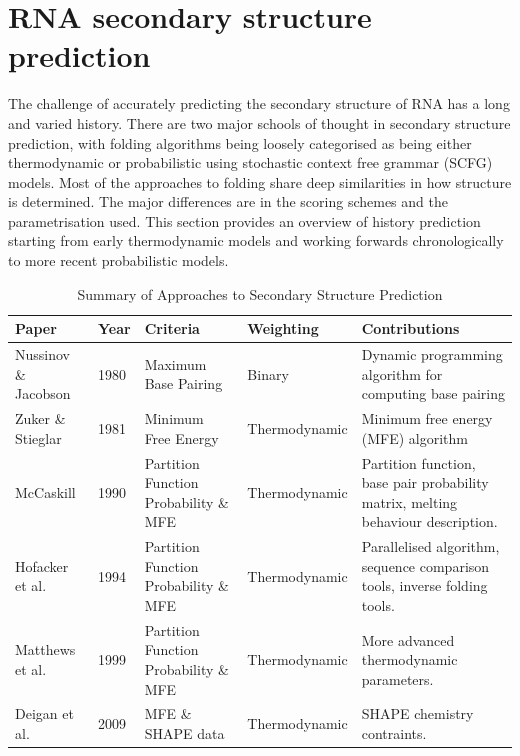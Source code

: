 \documentclass[journal]{IEEEtran}
\begin{document}
\section{RNA secondary structure prediction}
\label{sec:rna-secondary-structure}
The challenge of accurately predicting the secondary structure of RNA has a long and varied history. There are two major schools of thought in secondary structure prediction, with folding algorithms being loosely categorised as being either thermodynamic or probabilistic using stochastic context free grammar (SCFG) models. Most of the approaches to folding share deep similarities in how structure is determined. The major differences are in the scoring schemes and the parametrisation used. This section provides an overview of history prediction starting from early thermodynamic models and working forwards chronologically to more recent probabilistic models.

\begin{table}[t]
\centering
\caption{Summary of Approaches to Secondary Structure Prediction}
\label{my-label}
\begin{tabular}{|l|l|l|l|p{5cm}|}
\hline
\textbf{Paper}                             & \textbf{Year} & \textbf{Criteria}                     & \textbf{Weighting} & \textbf{Contributions}                                                           \\ \hline
Nussinov \& Jacobson \cite{nussinov1980fast}           & 1980          & Maximum Base Pairing                  & Binary             & Dynamic programming algorithm for computing base pairing                                     \\ \hline
Zuker \& Stieglar \cite{zuker1981optimal} & 1981          & Minimum Free Energy                   & Thermodynamic      & Minimum free energy (MFE) algorithm                                                    \\ \hline
McCaskill \cite{mccaskill1990equilibrium}  & 1990          & Partition Function Probability \& MFE & Thermodynamic      & Partition function, base pair probability matrix, melting behaviour description. \\ \hline

Hofacker et al. \cite{hofacker1994fast}  & 1994          & Partition Function Probability \& MFE & Thermodynamic      & Parallelised algorithm, sequence comparison tools, inverse folding tools. \\ \hline

Matthews et al. \cite{mathews1999expanded} & 1999          & Partition Function Probability \& MFE & Thermodynamic      & More advanced thermodynamic parameters. \\ \hline

Deigan et al. \cite{deigan2009accurate} & 2009          & MFE \& SHAPE data & Thermodynamic      & SHAPE chemistry contraints. \\ \hline

\end{tabular}
\end{table}
\end{document}
